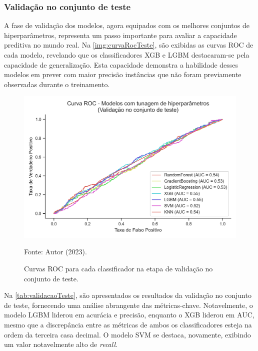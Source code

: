 \subsubsection{Validação no conjunto de teste}

A fase de validação dos modelos, agora equipados com os melhores conjuntos de hiperparâmetros, representa um passo importante para avaliar a capacidade preditiva no mundo real. Na \autoref{img:curvaRocTeste}, são exibidas as curvas ROC de cada modelo, revelando que os classificadores XGB e LGBM destacaram-se pela capacidade de generalização. Esta capacidade demonstra a habilidade desses modelos em prever com maior precisão instâncias que não foram previamente observadas durante o treinamento.

\begin{figure}[H]
	\centering
	\caption{\label{img:curvaRocTeste}Curvas ROC para cada classificador na etapa de validação no conjunto de teste.}
	\includegraphics[scale=0.7]{USPSC-img/curva_roc_modelos_teste.png}
	\begin{center}
		Fonte: Autor (2023).
	\end{center}
\end{figure}

Na \autoref{tab:validacaoTeste}, são apresentados os resultados da validação no conjunto de teste, fornecendo uma análise abrangente das métricas-chave. Notavelmente, o modelo LGBM liderou em acurácia e precisão, enquanto o XGB liderou em AUC, mesmo que a discrepância entre as métricas de ambos os classificadores esteja na ordem da terceira casa decimal. O modelo SVM se destaca, novamente, exibindo um valor notavelmente alto de \textit{recall}.

